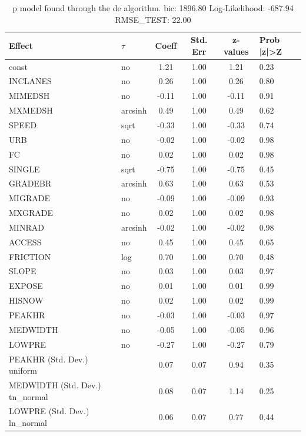 \begin{table}
	\caption{p model found through the de algorithm. bic: 1896.80 Log-Likelihood: -687.94 RMSE_TEST: 22.00}
	\begin{center}
		\begin{tabular}{|l|l|c|c|c|l|}
			\hline
			Effect & $\tau$ & Coeff & Std. Err & z-values & Prob |z|>Z \\
			\hline
			const & no & 1.21 & 1.00 & 1.21 & 0.23 \\
			\hline
			INCLANES & no & 0.26 & 1.00 & 0.26 & 0.80 \\
			\hline
			MIMEDSH & no & -0.11 & 1.00 & -0.11 & 0.91 \\
			\hline
			MXMEDSH & arcsinh & 0.49 & 1.00 & 0.49 & 0.62 \\
			\hline
			SPEED & sqrt & -0.33 & 1.00 & -0.33 & 0.74 \\
			\hline
			URB & no & -0.02 & 1.00 & -0.02 & 0.98 \\
			\hline
			FC & no & 0.02 & 1.00 & 0.02 & 0.98 \\
			\hline
			SINGLE & sqrt & -0.75 & 1.00 & -0.75 & 0.45 \\
			\hline
			GRADEBR & arcsinh & 0.63 & 1.00 & 0.63 & 0.53 \\
			\hline
			MIGRADE & no & -0.09 & 1.00 & -0.09 & 0.93 \\
			\hline
			MXGRADE & no & 0.02 & 1.00 & 0.02 & 0.98 \\
			\hline
			MINRAD & arcsinh & -0.02 & 1.00 & -0.02 & 0.98 \\
			\hline
			ACCESS & no & 0.45 & 1.00 & 0.45 & 0.65 \\
			\hline
			FRICTION & log & 0.70 & 1.00 & 0.70 & 0.48 \\
			\hline
			SLOPE & no & 0.03 & 1.00 & 0.03 & 0.97 \\
			\hline
			EXPOSE & no & 0.01 & 1.00 & 0.01 & 0.99 \\
			\hline
			HISNOW & no & 0.02 & 1.00 & 0.02 & 0.99 \\
			\hline
			PEAKHR & no & -0.03 & 1.00 & -0.03 & 0.97 \\
			\hline
			MEDWIDTH & no & -0.05 & 1.00 & -0.05 & 0.96 \\
			\hline
			LOWPRE & no & -0.27 & 1.00 & -0.27 & 0.79 \\
			\hline
			PEAKHR (Std. Dev.) uniform &  & 0.07 & 0.07 & 0.94 & 0.35 \\
			\hline
			MEDWIDTH (Std. Dev.) tn_normal &  & 0.08 & 0.07 & 1.14 & 0.25 \\
			\hline
			LOWPRE (Std. Dev.) ln_normal &  & 0.06 & 0.07 & 0.77 & 0.44 \\
			\hline
		\end{tabular}
	\end{center}
\end{table}
